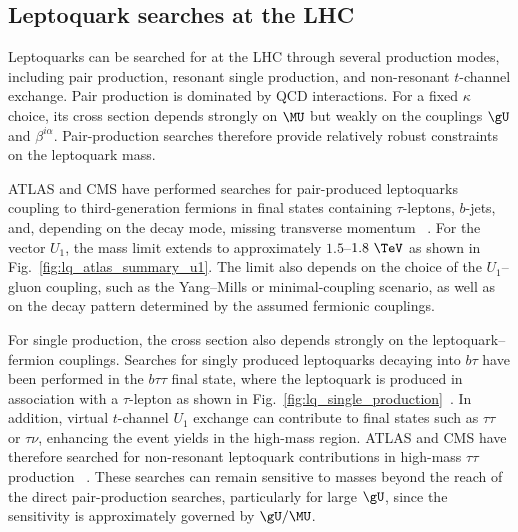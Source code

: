 \subsection{Leptoquark searches at the LHC}
\label{subsec:lq_searches_lhc}

Leptoquarks can be searched for at the LHC through several production modes, including pair production, resonant single production, and non-resonant $t$-channel exchange. Pair production is dominated by QCD interactions. For a fixed $\kappa$ choice, its cross section depends strongly on $\MU$ but weakly on the couplings $\gU$ and $\beta^{i\alpha}$. Pair-production searches therefore provide relatively robust constraints on the leptoquark mass.

ATLAS and CMS have performed searches for pair-produced leptoquarks coupling
to third-generation fermions in final states containing $\tau$-leptons,
$b$-jets, and, depending on the decay mode, missing transverse momentum
~\cite{ATLAS2023LQBTau,CMS2021LQThirdGen}.
For the vector $U_{1}$, the mass limit extends to approximately
$1.5$--$1.8~\TeV$ as shown in Fig.~\ref{fig:lq_atlas_summary_u1}. The limit also depends on the choice of the $U_{1}$--gluon coupling, such as the Yang--Mills or minimal-coupling scenario, as well as on the decay pattern determined by the assumed fermionic couplings.

For single production, the cross section also depends strongly on the leptoquark--fermion couplings. Searches for singly produced leptoquarks decaying into $b\tau$ have been performed in the $b\tau\tau$ final state, where the leptoquark is produced in association with a $\tau$-lepton as shown in Fig.~\ref{fig:lq_single_production}~\cite{ATLAS2023LQBTau,CMS2024LQBTau}. In addition, virtual $t$-channel $U_1$ exchange can contribute to final states such as $\tau\tau$ or $\tau\nu$, enhancing the event yields in the high-mass region. ATLAS and CMS have therefore searched for non-resonant leptoquark contributions in high-mass $\tau\tau$ production ~\cite{ATLAS2025HighMassTauTau,CMS2023TauTauLQ}. These searches can remain sensitive to masses beyond the reach of the direct pair-production searches, particularly for large $\gU$, since the sensitivity is approximately governed by $\gU/\MU$.


